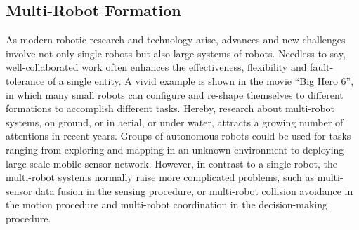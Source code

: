 \subsection{Multi-Robot Formation}

As modern robotic research and technology arise, advances and new challenges
involve not only single robots but also large systems of robots. 
Needless to say, well-collaborated work often enhances the effectiveness, flexibility and
fault-tolerance of a single entity. 
A vivid example is shown in the movie ``Big Hero 6'', in which many small robots can configure and re-shape themselves to different formations to accomplish different tasks.
Hereby, research about multi-robot systems, on ground, or in aerial, or under water, attracts a growing number of attentions in recent years\cite{CaoFukKahMen95, DudJenMilWil96, BahSoySah03}. 
Groups of autonomous robots could be used for tasks ranging from exploring and mapping in an unknown environment to deploying large-scale mobile sensor network. 
However, in contrast to a single robot, the multi-robot systems normally raise more complicated problems, such as multi-sensor data fusion in the sensing procedure, or multi-robot collision
avoidance in the motion procedure and multi-robot coordination in the decision-making procedure.

